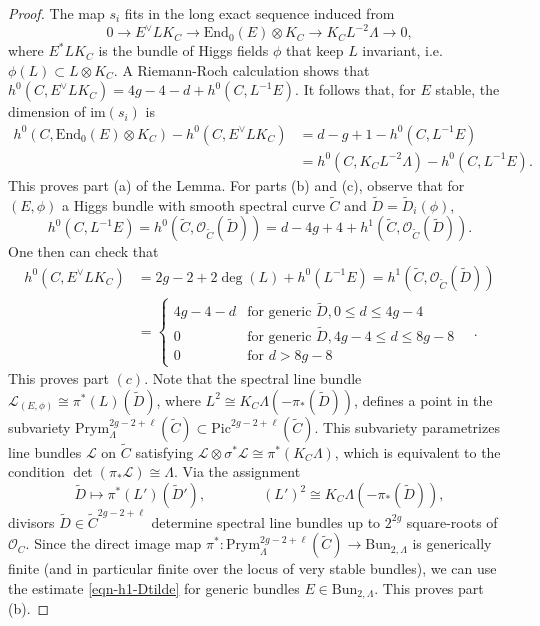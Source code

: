 \documentclass[twoside, 11pt]{article}
\numberwithin{equation}{section}
\theoremstyle{theorem}
\numberwithin{theorem}{section}
\theoremstyle{definition}
\begin{document}
\begin{proof}
The map $s_i$ fits in the long exact sequence induced from 
\begin{equation}\label{eqn-s.e.s-1}
0 \longrightarrow E^\vee L K_C 
\longrightarrow \mathrm{End}_0(E) \otimes K_C \longrightarrow K_C L^{-2} \Lambda  
\longrightarrow 0,    
\end{equation}
where $E^\ast L K_C$ is the bundle of Higgs fields $\phi$ that keep $L$ invariant, i.e. $\phi(L) \subset L\otimes K_C$. A Riemann-Roch calculation shows that $h^0(C, E^\vee L K_C) = 4g-4 - d + h^0(C, L^{-1}E)$. It follows that, for $E$ stable, the dimension of $\mathrm{im}(s_i)$ is
\begin{align*}
    h^0(C, \mathrm{End}_0(E) \otimes K_C) - h^0(C, E^\vee L K_C) &= d - g +1 - h^0(C, L^{-1}E) \\ &= h^0(C, K_C L^{-2}\Lambda) - h^0(C, L^{-1}E).
\end{align*}
This proves part (a) of the Lemma. 
For parts (b) and (c), observe that for $(E, \phi)$ a Higgs bundle with smooth spectral curve $\widetilde{C}$ and $\tilde{D} = \tilde{D}_i(\phi)$,
\[ h^0(C, L^{-1} E) = h^0(\widetilde{C}, \mathcal{O}_{\widetilde{C}}(\tilde{D})) = d - 4g + 4 + h^1(\widetilde{C}, \mathcal{O}_{\widetilde{C}}(\tilde{D})). \]
One then can check that
\begin{align}\label{eqn-h1-Dtilde}
    h^0(C, E^\vee L K_C) &= 2g - 2 + 2 \deg(L) + h^0(L^{-1} E) = h^1(\widetilde{C}, \mathcal{O}_{\widetilde{C}}(\tilde{D})) \nonumber \\
    &= \begin{cases}
    4g - 4 - d &\text{for generic } \tilde{D}, 0 \leq d \leq 4g-4 \\
    0 &\text{for generic } \tilde{D}, 4g-4 \leq d \leq 8g-8  \\
    0 &\text{for } d > 8g-8
    \end{cases} \quad .
\end{align}
This proves part $(c)$.
Note that the spectral line bundle $\mathcal{L}_{(E, \phi)} \cong \pi^\ast(L)(\tilde{D})$, where $L^2 \cong K_C \Lambda(-\pi_\ast(\tilde{D}))$, 
defines a point in the subvariety $\mathrm{Prym}^{2g-2+\ell}_\Lambda(\widetilde{C}) \subset \mathrm{Pic}^{2g-2+\ell}(\widetilde{C})$. This subvariety parametrizes line bundles $\mathcal{L}$ on $\widetilde{C}$ satisfying $\mathcal{L} \otimes \sigma^\ast \mathcal{L} \cong \pi^\ast(K_C \Lambda)$, which is equivalent to the condition $\det(\pi_\ast \mathcal{L}) \cong \Lambda$. 
Via the assignment 
\[ \tilde{D} \longmapsto \pi^\ast(L')(\tilde{D}'), \qquad \qquad (L')^2 \cong K_C \Lambda(-\pi_\ast(\tilde{D})), \]
divisors $\tilde{D} \in \widetilde{C}^{2g-2+\ell}$ determine spectral line bundles up to $2^{2g}$ square-roots of $\mathcal{O}_C$. Since the direct image map $\pi^\ast: \mathrm{Prym}^{2g-2+\ell}_\Lambda(\widetilde{C}) \rightarrow \mathrm{Bun}_{2, \Lambda}$ is generically finite (and in particular finite over the locus of very stable bundles), we can use the estimate \eqref{eqn-h1-Dtilde} for generic bundles $E \in \mathrm{Bun}_{2, \Lambda}$. This proves part (b).
\end{proof}
\end{document}
